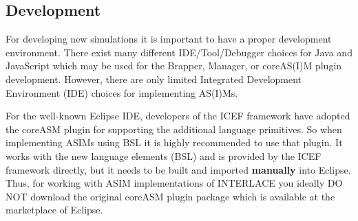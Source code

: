 \subsection{Development}
\label{sec:development}
For developing new simulations it is important to have a proper development environment. There exist many different IDE/Tool/Debugger choices for Java and JavaScript which may be used for the Brapper, Manager, or coreAS(I)M plugin development. However, there are only limited Integrated Development Environment (IDE) choices for implementing AS(I)Ms.

For the well-known Eclipse IDE, developers of the ICEF framework have adopted the coreASM plugin for supporting the additional language primitives. So when implementing ASIMs using BSL it is highly recommended to use that plugin. It works with the new language elements (BSL) and is provided by the ICEF framework directly, but it needs to be built and imported \textbf{manually} into Eclipse. Thus, for working with ASIM implementations of INTERLACE you ideally DO NOT download the original coreASM plugin package which is available at the marketplace of Eclipse.

